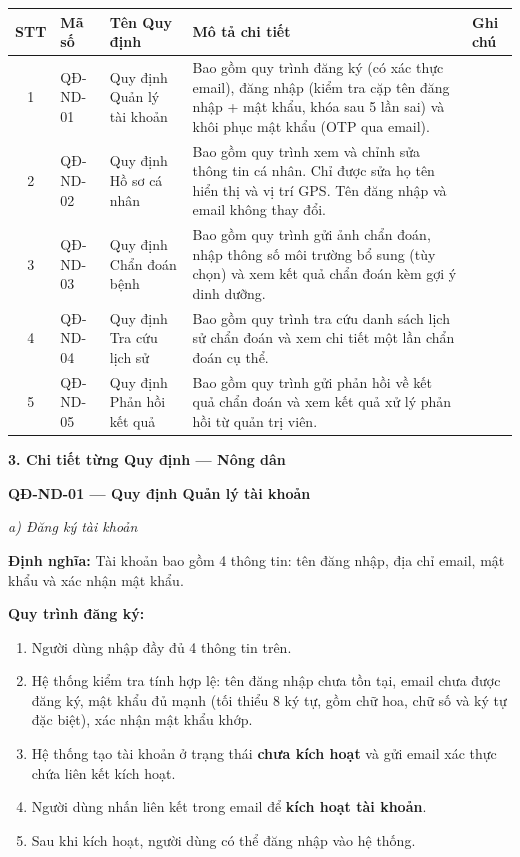 ﻿\documentclass[12pt,a4paper]{article}
\begin{document}
\begin{longtable}{|c|p{2cm}|p{3.5cm}|p{6cm}|p{1cm}|}
\hline
\rowcolor{headerblue}
\textbf{STT} & \textbf{Mã số} & \textbf{Tên Quy định} & \textbf{Mô tả chi tiết} & \textbf{Ghi chú} \\
\hline
\endhead
1 & QĐ-ND-01 & Quy định Quản lý tài khoản & Bao gồm quy trình đăng ký (có xác thực email), đăng nhập (kiểm tra cặp tên đăng nhập + mật khẩu, khóa sau 5 lần sai) và khôi phục mật khẩu (OTP qua email). & \\
\hline
2 & QĐ-ND-02 & Quy định Hồ sơ cá nhân & Bao gồm quy trình xem và chỉnh sửa thông tin cá nhân. Chỉ được sửa họ tên hiển thị và vị trí GPS. Tên đăng nhập và email không thay đổi. & \\
\hline
3 & QĐ-ND-03 & Quy định Chẩn đoán bệnh & Bao gồm quy trình gửi ảnh chẩn đoán, nhập thông số môi trường bổ sung (tùy chọn) và xem kết quả chẩn đoán kèm gợi ý dinh dưỡng. & \\
\hline
4 & QĐ-ND-04 & Quy định Tra cứu lịch sử & Bao gồm quy trình tra cứu danh sách lịch sử chẩn đoán và xem chi tiết một lần chẩn đoán cụ thể. & \\
\hline
5 & QĐ-ND-05 & Quy định Phản hồi kết quả & Bao gồm quy trình gửi phản hồi về kết quả chẩn đoán và xem kết quả xử lý phản hồi từ quản trị viên. & \\
\hline
\end{longtable}

\vspace{0.3cm}
\textbf{3. Chi tiết từng Quy định --- Nông dân}

\vspace{0.3cm}
\noindent\textbf{QĐ-ND-01 --- Quy định Quản lý tài khoản}

\noindent\textit{a) Đăng ký tài khoản}

\noindent\textbf{Định nghĩa:} Tài khoản bao gồm 4 thông tin: tên đăng nhập, địa chỉ email, mật khẩu và xác nhận mật khẩu.

\noindent\textbf{Quy trình đăng ký:}
\begin{enumerate}
    \item Người dùng nhập đầy đủ 4 thông tin trên.
    \item Hệ thống kiểm tra tính hợp lệ: tên đăng nhập chưa tồn tại, email chưa được đăng ký, mật khẩu đủ mạnh (tối thiểu 8 ký tự, gồm chữ hoa, chữ số và ký tự đặc biệt), xác nhận mật khẩu khớp.
    \item Hệ thống tạo tài khoản ở trạng thái \textbf{chưa kích hoạt} và gửi email xác thực chứa liên kết kích hoạt.
    \item Người dùng nhấn liên kết trong email để \textbf{kích hoạt tài khoản}.
    \item Sau khi kích hoạt, người dùng có thể đăng nhập vào hệ thống.
\end{enumerate}
\end{document}

